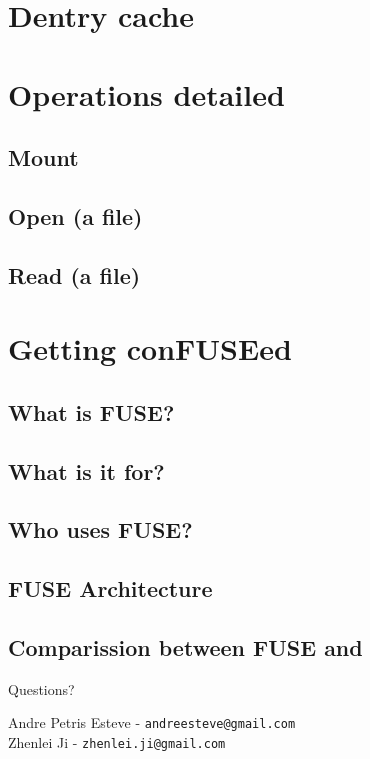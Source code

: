 \documentclass{beamer}
\begin{document}
\section{Dentry cache}


\section{Operations detailed}

\subsection{Mount}

\subsection{Open (a file)}

\subsection{Read (a file)}


\section{Getting conFUSEed}

\subsection{What is FUSE?}

\subsection{What is it for?}

\subsection{Who uses FUSE?}

\subsection{FUSE Architecture}

\subsection{Comparission between FUSE and}


\begin{frame}[plain]

  \begin{center}
    \Huge Questions?
  \end{center}

  \vspace{0.2in}

  \begin{center}
	Andre Petris Esteve - \texttt{andreesteve@gmail.com}\\
	Zhenlei Ji - \texttt{zhenlei.ji@gmail.com}
  \end{center}
\end{frame}
\end{document}
